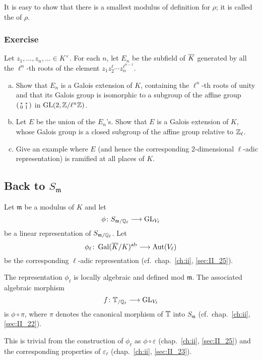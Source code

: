 \begin{obs}
It is easy to show that there is a smallest modulus of definition for $\rho$;
it is called the  of $\rho$.
\end{obs}

\subsubsection*{Exercise}
Let $z_1, \dots, z_n, \dots \in K^\times$. For each $n$, let $E_n$ be the
\dpage
subfield of $\overline{K}$ generated by all the $\ell^n$-th roots of the element
$z_1 z_2^\ell \cdots z_n^{\ell^{n-1}}$.
\begin{enumerate}[a)]
\item Show that $E_n$ is a Galois extension of $K$, containing the $\ell^n$-th
	roots of unity and that its Galois group is isomorphic to a subgroup of
	the affine group $
	\begin{psmallmatrix}
		* & * \\
		0 & 1
	\end{psmallmatrix} 
	$ in $\operatorname{GL}(2, \mathbb{Z}/\ell^n\mathbb{Z})$.
\item Let $E$ be the union of the $E_n$'s. Show that $E$ is a Galois extension
	of $K$, whose Galois group is a closed subgroup of the affine group
	relative to $\mathbb{Z}_\ell$.
\item Give an example where $E$ (and hence the corresponding 2-dimensional
	$\ell$-adic representation) is ramified at all places of $K$.
\end{enumerate}

\subsection{Back to \texorpdfstring{$S_{\mathfrak{m}}$}{Sm}}
\label{sec:III_23}
Let $\mathfrak{m}$ be a modulus of $K$ and let
\[
	\phi \colon S_{\mathfrak{m}/\mathbb{Q}_\ell} \longrightarrow \operatorname{GL}_{V_\ell}
\]
be a linear representation of $S_{\mathfrak{m}/\mathbb{Q}_\ell}$. Let
\[
	\phi_\ell \colon \operatorname{Gal}(\overline{K}/K)^{\mathrm{ab}} \longrightarrow \operatorname{Aut}(V_\ell)
\]
be the corresponding $\ell$-adic representation (cf.\ chap.~\ref{ch:ii},
\ref{sec:II_25}).

\begin{thm}\label{thm:III_23_1}
	The representation $\phi_\ell$ is locally algebraic and defined mod
	$\mathfrak{m}$. The associated algebraic morphism
	\dpage
	\[
		f \colon \mathbb{T}_{/\mathbb{Q}_\ell} \longrightarrow \operatorname{GL}_{V_\ell}
	\]
	is $\phi \circ \pi$, where $\pi$ denotes the canonical morphism of
	$\mathbb{T}$ into $S_{\mathfrak{m}}$ (cf.\ chap.~\ref{ch:ii},
	\ref{sec:II_22}).
\end{thm}
This is trivial from the construction of $\phi_\ell$ as $\phi \circ
\varepsilon$ (chap.~\ref{ch:ii}, \ref{sec:II_25}) and the corresponding
properties of $\varepsilon_\ell$ (chap.~\ref{ch:ii}, \ref{sec:II_23}).

